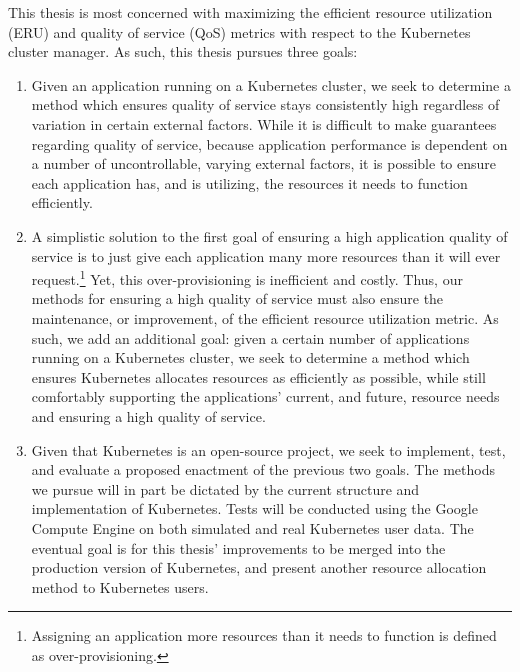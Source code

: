 This thesis is most concerned with maximizing the efficient resource utilization
(ERU) and quality of service (QoS) metrics with respect to the Kubernetes cluster manager.
As such, this thesis pursues three goals:

\begin{enumerate}
  \item Given an application running on a Kubernetes cluster, we seek to
    determine a method which ensures quality of
    service stays consistently high regardless of variation in
    certain external factors. While it is
    difficult to make guarantees regarding quality of service, because
    application performance is dependent on a number of uncontrollable, varying
    external factors, it is possible to
    ensure each application has, and is utilizing, the resources it needs to
    function efficiently.
  \item A simplistic solution to the first goal of ensuring a high application
    quality of service is to just give each application many more resources than
    it will ever request.\footnote{Assigning an application more resources than it needs
    to function is defined as over-provisioning.}
    Yet, this over-provisioning is inefficient and costly. Thus, our
    methods for ensuring a high quality of service must also ensure the
    maintenance, or improvement, of the efficient resource utilization metric.
    As such, we add an additional goal: given a certain number of applications
    running on a Kubernetes cluster,
    we seek to determine a method which ensures Kubernetes allocates resources
    as efficiently as possible, while still comfortably
    supporting the applications' current, and future, resource needs and
    ensuring a high quality of service.
  \item Given that Kubernetes is an open-source project, we seek to implement, test, and
    evaluate a proposed enactment of the previous two goals.
    The methods we pursue will
    in part be dictated by the current structure and implementation of
    Kubernetes. Tests will be conducted using the Google Compute
    Engine\cite{google-compute-engine} on both
    simulated and real Kubernetes user data. The eventual goal is for this
    thesis' improvements to be merged into the production version of Kubernetes,
    and present another resource allocation method to Kubernetes users.
\end{enumerate}

